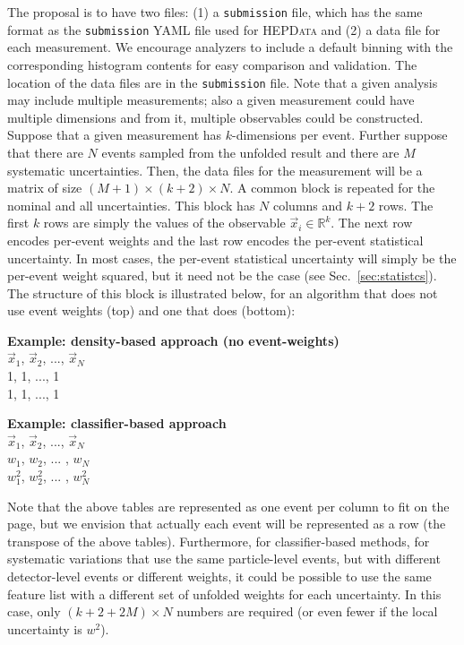 \documentclass[a4paper,11pt]{article}
\begin{document}
The proposal is to have two files: (1) a \texttt{submission} file, which has the same format as the \texttt{submission} YAML file used for \textsc{HEPData} and (2) a data file for each measurement.  We encourage analyzers to include a default binning with the corresponding histogram contents for easy comparison and validation.  The location of the data files are in the \texttt{submission} file.  Note that a given analysis may include multiple measurements; also a given measurement could have multiple dimensions and from it, multiple observables could be constructed.  Suppose that a given measurement has $k$-dimensions per event.  Further suppose that there are $N$ events sampled from the unfolded result and there are $M$ systematic uncertainties.  Then, the data files for the measurement will be a matrix of size $(M+1)\times (k+2)\times N$.  A common block is repeated for the nominal and all uncertainties.  This block has $N$ columns and $k+2$ rows.  The first $k$ rows are simply the values of the observable $\vec{x}_i\in\mathbb{R}^k$.  The next row encodes per-event weights and the last row encodes the per-event statistical uncertainty.  In most cases, the per-event statistical uncertainty will simply be the per-event weight squared, but it need not be the case (see Sec.~\ref{sec:statistcs}).  The structure of this block is illustrated below, for an algorithm that does not use event weights (top) and one that does (bottom):\\

 \begin{tcolorbox}
\textbf{Example: density-based approach (no event-weights)}\\
$\vec{x}_1$, $\vec{x}_2$, ..., $\vec{x}_N$\\
1, 1, ..., 1\\
1, 1, ..., 1
 \end{tcolorbox}
 
  \begin{tcolorbox}
\textbf{Example: classifier-based approach}\\
$\vec{x}_1$, $\vec{x}_2$, ..., $\vec{x}_N$\\
$w_1$, $w_2$, ... , $w_N$\\
$w_1^2$, $w_2^2$, ... , $w_N^2$
 \end{tcolorbox}
 
 Note that the above tables are represented as one event per column to fit on the page, but we envision that actually each event will be represented as a row (the transpose of the above tables).  Furthermore, for classifier-based methods, for systematic variations that use the same particle-level events, but with different detector-level events or different weights, it could be possible to use the same feature list with a different set of unfolded weights for each uncertainty.  In this case, only $(k+2+2M)\times N$ numbers are required (or even fewer if the local uncertainty is $w^2$).
 
\end{document}
